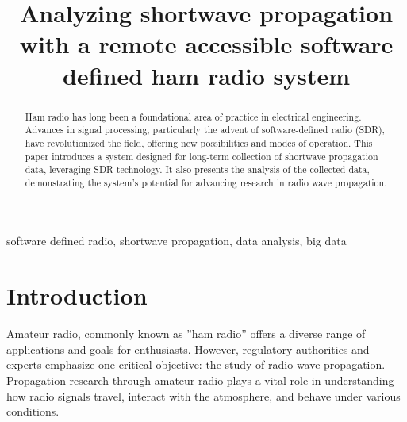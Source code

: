 \documentclass[conference]{IEEEtran}
\begin{document}
\title{Analyzing shortwave propagation with a remote accessible software defined ham radio system}

\author{
\and
{}
}

\maketitle

\begin{abstract}
Ham radio has long been a foundational area of practice in electrical
  engineering. Advances in signal processing, particularly the advent of
  software-defined radio (SDR), have revolutionized the field, offering new
  possibilities and modes of operation. This paper introduces a system designed
  for long-term collection of shortwave propagation data, leveraging SDR
  technology. It also presents the analysis of the collected data,
  demonstrating the system's potential for advancing research in radio wave
  propagation.
\end{abstract}

\begin{IEEEkeywords}
software defined radio, shortwave propagation, data analysis, big data
\end{IEEEkeywords}

\section{Introduction}

Amateur radio, commonly known as ''ham radio'' offers a diverse range of
applications and goals for enthusiasts. However, regulatory authorities and
experts emphasize one critical objective: the study of radio wave propagation.
Propagation research through amateur radio plays a vital role in understanding
how radio signals travel, interact with the atmosphere, and behave under
various conditions.
\end{document}
